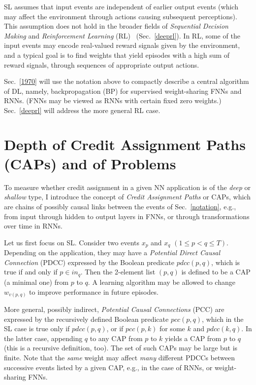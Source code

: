 \documentclass[letterpaper]{article}
\begin{document}
SL assumes that input events are independent of earlier output events (which may affect
the environment  through actions causing subsequent perceptions).
This assumption does not hold 
in the broader fields of {\em Sequential Decision Making} and  {\em Reinforcement Learning} (RL)~\citep{Kaelbling:96,Sutton:98,Hutter:05book+,wiering2012} (Sec.~\ref{deeprl}).
In RL, some of the input events may encode real-valued reward signals given by the environment, 
and a typical goal is to find weights that yield episodes with a high sum of reward signals,
through sequences of appropriate output actions.

Sec.~\ref{1970} will use the notation above to compactly 
describe a central algorithm of DL, namely,
backpropagation (BP) for supervised weight-sharing FNNs and RNNs.
(FNNs may be viewed as RNNs with certain fixed zero weights.)
Sec.~\ref{deeprl} will address the more general RL case.




\section{Depth of Credit Assignment Paths (CAPs) and of Problems}
\label{caps}

To measure whether credit assignment in a given 
NN application is of the {\em deep} or {\em shallow} type,
I introduce the concept of {\em Credit Assignment Paths} or CAPs,
which are chains of possibly causal links between the events of Sec.~\ref{notation},
e.g., from input through hidden to output layers in FNNs, or through 
transformations over time in RNNs. 

Let us first focus on SL.
Consider two events 
$x_p$ and $x_q$ $(1 \leq p < q \leq T)$.
Depending on the application, they may have a
{\em Potential Direct Causal Connection} (PDCC) expressed by the Boolean
predicate $pdcc(p,q)$, which
is true if and only if $p \in in_q$.
Then the 2-element list $(p,q)$ is defined to be a CAP (a minimal one) from $p$ to $q$.
A learning algorithm may be allowed to change  $w_{v(p,q)}$ to improve performance
in future episodes.

More general, possibly indirect,
{\em Potential Causal Connections} (PCC) are expressed by the 
recursively defined Boolean
predicate $pcc(p,q)$, which in the SL case 
is true only if $pdcc(p,q)$, or if
$pcc(p,k)$ for some $k$ and $pdcc(k,q)$.
In the latter case,
appending $q$ to any CAP from $p$ to $k$ yields a CAP from $p$ to $q$
 (this is a recursive definition, too).
The set of such CAPs may be large but is finite. 
Note that the {\em same} weight may affect {\em many} different PDCCs
between successive events listed by a given CAP, 
e.g., in the case of RNNs, or weight-sharing FNNs.
\end{document}

